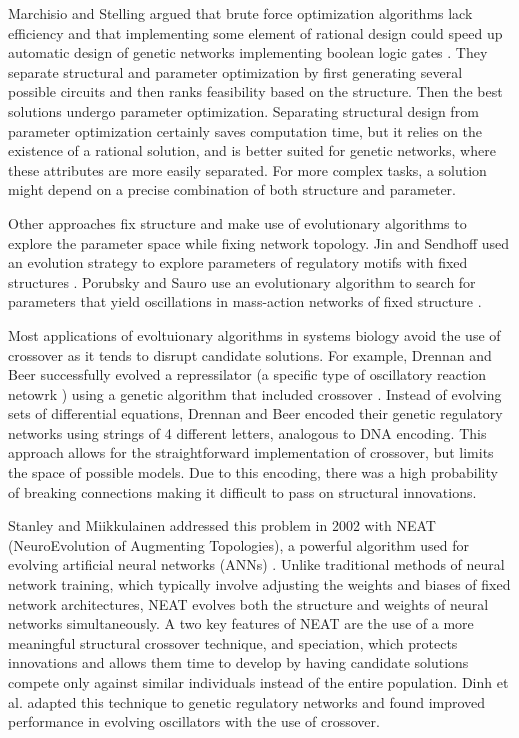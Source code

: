 \documentclass[12pt]{report}
\begin{document}
Marchisio and Stelling argued that brute force optimization algorithms lack efficiency and that implementing some element of rational design could speed up automatic design of genetic networks implementing boolean logic gates \cite{marchisio_automatic_2011}. They separate structural and parameter optimization by first generating several possible circuits and then ranks feasibility based on the structure. Then the best solutions undergo parameter optimization. Separating structural design from parameter optimization certainly saves computation time, but it relies on the existence of a rational solution, and is better suited for genetic networks, where these attributes are more easily separated. For more complex tasks, a solution might depend on a precise combination of both structure and parameter.

Other approaches fix structure and make use of evolutionary algorithms to explore the parameter space while fixing network topology. Jin and Sendhoff used an evolution strategy to explore parameters of regulatory motifs with fixed structures \cite{jin_evolving_2008}. Porubsky and Sauro use an evolutionary algorithm to search for parameters that yield oscillations in mass-action networks of fixed structure \cite{porubsky2019}.

Most applications of evoltuionary algorithms in systems biology avoid the use of crossover as it tends to disrupt candidate solutions. For example, Drennan and Beer successfully evolved a repressilator (a specific type of oscillatory reaction netowrk \cite{Elowitz2000}) using a genetic algorithm that included crossover \cite{drennan_beer}. Instead of evolving sets of differential equations, Drennan and Beer encoded their genetic regulatory networks using strings of 4 different letters, analogous to DNA encoding. This approach allows for the straightforward implementation of crossover, but limits the space of possible models. Due to this encoding, there was a high probability of breaking connections making it difficult to pass on structural innovations.


 Stanley and Miikkulainen addressed this problem in 2002 with NEAT (NeuroEvolution of Augmenting Topologies), a powerful algorithm used for evolving artificial neural networks (ANNs) \cite{stanley_evolving_2002}. Unlike traditional methods of neural network training, which typically involve adjusting the weights and biases of fixed network architectures, NEAT evolves both the structure and weights of neural networks simultaneously. A two key features of NEAT are the use of a more meaningful structural crossover technique, and speciation, which protects innovations and allows them time to develop by having candidate solutions compete only against similar individuals instead of the entire population. Dinh et al. adapted this technique to genetic regulatory networks and found improved performance in evolving oscillators with the use of crossover.
\end{document}
